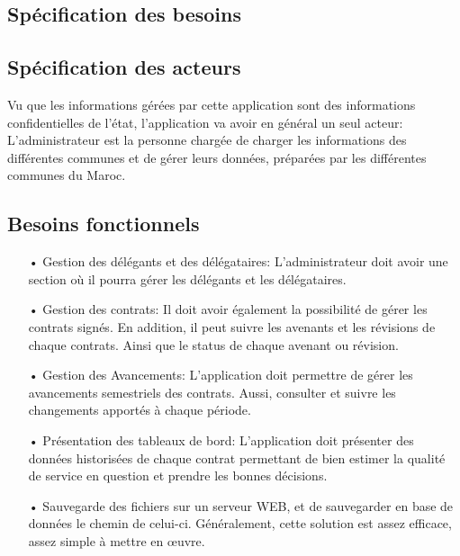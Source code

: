 \documentclass[a4paper]{report}
\begin{document}
\begin{doublespace}
	\section{Spécification des besoins}

	\subsection{Spécification des acteurs}
	Vu que les informations gérées par cette application sont des informations confidentielles de l'état, l'application va avoir en général un seul acteur:
	L'administrateur est la personne chargée de charger les informations des différentes communes et de gérer leurs données, préparées par les différentes communes du Maroc.
	\subsection{Besoins fonctionnels}
	\begin{itemize}
		\item[•] Gestion des délégants et des délégataires: L'administrateur doit avoir
		      une section où il pourra gérer les délégants et les délégataires.
		\item[•] Gestion des contrats: Il doit avoir également la possibilité de gérer les contrats signés. En addition, il peut suivre les avenants et les révisions de chaque contrats. Ainsi que le status de chaque avenant ou révision.
		\item[•] Gestion des Avancements: L'application doit permettre de gérer les avancements semestriels des contrats. Aussi, consulter et suivre les changements apportés à chaque période.
		\item[•] Présentation des tableaux de bord: L'application doit présenter des données historisées de chaque contrat permettant de bien estimer la qualité de service en question et prendre les bonnes décisions.
		\item[•] Sauvegarde des fichiers sur un serveur WEB, et de sauvegarder en base de données le chemin de celui-ci. Généralement, cette solution est assez efficace, assez simple à mettre en œuvre.
	\end{itemize}

\end{doublespace}
\end{document}
